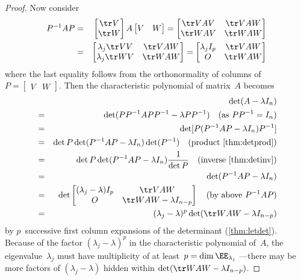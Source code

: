 \begin{proof}
Now consider
\begin{eqnarray*}
P^{-1}AP
&=&\begin{bmatrix} \tr V\\\tr W \end{bmatrix}A\begin{bmatrix} V&W \end{bmatrix}
=\begin{bmatrix} \tr VAV&\tr VAW\\\tr WAV&\tr WAW \end{bmatrix}
\\
&=&\begin{bmatrix} \lambda_j\tr VV&\tr VAW\\\lambda_j\tr WV&\tr WAW \end{bmatrix}
=\begin{bmatrix} \lambda_jI_p&\tr VAW\\O&\tr WAW \end{bmatrix}
\end{eqnarray*}
where the last equality follows from the orthonormality of columns of \(P=\begin{bmatrix} V&W \end{bmatrix}\).
Then the characteristic polynomial of matrix~\(A\) becomes
\begin{eqnarray*}
&&\hspace{-1.5em}\det(A-\lambda I_n)
\\&=&\det(PP^{-1}APP^{-1}-\lambda PP^{-1})
\quad(\text{as }PP^{-1}=I_n)
\\&=&\det[P(P^{-1}AP-\lambda I_n)P^{-1}]
\\&=&\det P\det(P^{-1}AP-\lambda I_n)\det(P^{-1})
\quad(\text{product \autoref{thm:detprod}})
\\&=&\det P\det(P^{-1}AP-\lambda I_n)\frac1{\det P}
\quad(\text{inverse \autoref{thm:detinv}})
\\&=&\det(P^{-1}AP-\lambda I_n)
\\&=&\det\begin{bmatrix} (\lambda_j-\lambda)I_p&\tr VAW\\O&\tr WAW -\lambda I_{n-p}\end{bmatrix}
\quad(\text{by above }P^{-1}AP)
\\&=&(\lambda_j-\lambda)^p\det(\tr WAW -\lambda I_{n-p})
\end{eqnarray*}
by \(p\)~successive first column expansions of the determinant (\autoref{thm:letdet}).
Because of the factor \((\lambda_j-\lambda)^p\) in the characteristic polynomial of~\(A\), the eigenvalue~\(\lambda_j\) must have multiplicity of at least~\(p=\dim\EE_{\lambda_j}\)
---there may be more factors of \((\lambda_j-\lambda)\) hidden within \(\det(\tr WAW -\lambda I_{n-p})\).
\end{proof}



